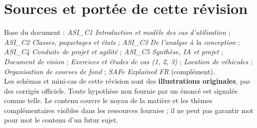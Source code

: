 \documentclass[10pt,a4paper]{article}
\begin{document}
\clearpage\clearpage\section*{Sources et portée de cette révision}
Base du document : \textit{ASI\_C1 Introduction et modèle des cas d'utilisation} ; \textit{ASI\_C2 Classes, paquetages et états} ; \textit{ASI\_C3 De l'analyse à la conception} ; \textit{ASI\_C4 Conduite de projet et agilité} ; \textit{ASI\_C5 Synthèse, IA et projet} ; \textit{Document de vision} ; \textit{Exercices et études de cas (1, 2, 3)} ; \textit{Location de véhicules} ; \textit{Organisation de courses de fond} ; \textit{SAFe Explained FR} (complément).\\
Les schémas et mini-cas de cette révision sont des \textbf{illustrations originales}, pas des corrigés officiels. Toute hypothèse non fournie par un énoncé est signalée comme telle. Le contenu couvre le noyau de la matière et les thèmes complémentaires visibles dans les ressources fournies ; il ne peut pas garantir mot pour mot le contenu d'un futur sujet.
\end{document}
